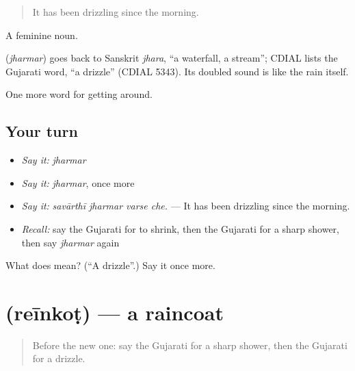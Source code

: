 \begin{quote}
It has been drizzling since the morning.
\end{quote}

A feminine noun.

\begin{cousinweb}
\textbf{} (\emph{jharmar}) goes back to Sanskrit \emph{jhara}, \textquotedblleft{}a waterfall, a stream\textquotedblright{}; CDIAL lists the Gujarati word, \textquotedblleft{}a drizzle\textquotedblright{} (CDIAL 5343). Its doubled sound is like the rain itself.
\end{cousinweb}

\begin{grammarlens}[title={What you've built}]
One more word for getting around.
\end{grammarlens}

\subsection*{Your turn}
\begin{itemize}
\raggedright
  \item \emph{Say it:} \emph{jharmar}
  \item \emph{Say it:} \emph{jharmar}, once more
  \item \emph{Say it:} \emph{savārthī jharmar varse che.} — It has been drizzling since the morning.
  \item \emph{Recall:} say the Gujarati for to shrink, then the Gujarati for a sharp shower, then say \emph{jharmar} again
\end{itemize}

\begin{tcolorbox}[breakable,colback=teal!4,colframe=teal!35!black,title={Before you move on}]
What does  mean? (\textquotedblleft{}A drizzle\textquotedblright{}.) Say it once more.
\end{tcolorbox}
\section[\texorpdfstring{\gu{રેઈનકોટ} (reīnkoṭ)}{રેઈનકોટ (reīnkoṭ)}]{ (reīnkoṭ) — a raincoat}

\label{lesson:GU-C434-reinkot}



\begin{quote}
Before the new one: say the Gujarati for a sharp shower, then the Gujarati for a drizzle.
\end{quote}

